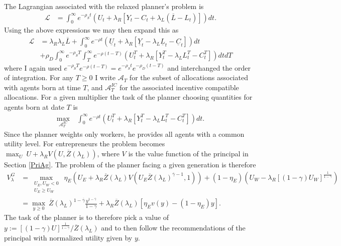 \documentclass[11pt]{article}
\theoremstyle{plain}
\begin{document}
The Lagrangian associated with the relaxed planner's problem is
\begin{align*}
\mathcal{L} & = \int_0^{\infty} e^{-\rho_S t} {\left(U_t + \lambda_R{\left[Y_t - C_t + \lambda_L(\overline{L} - L_t)\right]} \right)}dt.
\end{align*}
Using the above expressions we may then expand this as 
\begin{align*}
\mathcal{L} %
& = \lambda_R\lambda_L\overline{L} + \int_0^{\infty} e^{-\rho t} {\left(\underline{U}_t + \lambda_R{\left[\underline{Y}_t - \lambda_L\underline{L}_t - \underline{C}_t\right]} \right)}dt
\\ & + \rho_D\int_0^{\infty}e^{-\rho_S T} \int_{T}^{\infty} e^{- \rho (t-T)}{\left(U^T_t + \lambda_R{\left[Y^T_t  - \lambda_LL^T_t - C^T_t\right]} \right)}dtdT
\end{align*}
where I again used $e^{-\rho_S T}e^{- \rho (t-T)} = e^{- \rho_St}e^{-\rho_D(t-T)}$ and interchanged the order of integration. For any $T \geq0$ I write $\mathcal{A}_T$ for the subset of allocations associated with agents born at time $T$, and $\mathcal{A}^{IC}_T$ for the associated incentive compatible allocations. For a given multiplier the task of the planner choosing quantities for agents born at date $T$ is 
\begin{align*}
\max_{\mathcal{A}^{IC}_T} \ & \int_{0}^{\infty} e^{-\rho t} (U^T_t + \lambda_R[Y^T_t - \lambda_LL^T_t - C^T_t])dt.
\end{align*}
Since the planner weights only workers, he provides all agents with a common utility level. For entrepreneurs the problem becomes $\max_U \ U + \lambda_RV(U,\overline{Z}(\lambda_L))$, where $V$ is the value function of the principal in Section \ref{PriAg}. The problem of the planner facing a given generation is therefore
\begin{align*}
V^G_{\lambda} & = \max_{\substack{U_E,U_W < 0 \\ U_E \geq U_W}} \ \eta_E{\left(U_E + \lambda_R\overline{Z}(\lambda_L)V(U_E\overline{Z}(\lambda_L)^{\overline{\gamma}-1},1)\right)} + (1-\eta_E) {\left(U_W - \lambda_R[(1-\gamma)U_W]^{\frac{1}{1-\overline{\gamma}}}\right)}
\\ & = \max_{y \geq 0} \ \overline{Z}(\lambda_L)^{1-\overline{\gamma}}\frac{y^{1-\overline{\gamma}}}{1-\gamma} + \lambda_R\overline{Z}(\lambda_L)[\eta_E v(y) - (1-\eta_E) y].
\end{align*}
The task of the planner is to therefore pick a value of $y := [(1-\gamma)U]^{\frac{1}{1-\overline{\gamma}}}/\overline{Z}(\lambda_L)$ and to then follow the recommendations of the principal with normalized utility given by $y$. 
\end{document}
